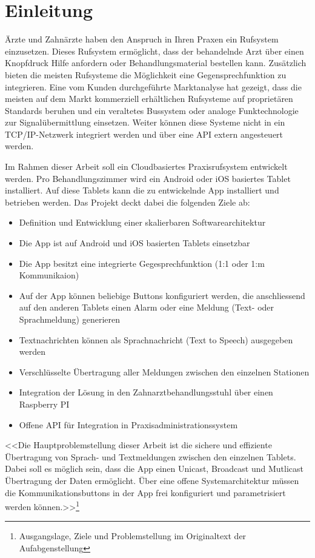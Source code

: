 \section{Einleitung}\label{sec:einleitung}

Ärzte und Zahnärzte haben den Anspruch in Ihren Praxen ein Rufsystem einzusetzen.
Dieses Rufsystem ermöglicht, dass der behandelnde Arzt über einen Knopfdruck Hilfe anfordern oder Behandlungsmaterial bestellen kann.
Zusätzlich bieten die meisten Rufsysteme die Möglichkeit eine Gegensprechfunktion zu integrieren.
Eine vom Kunden durchgeführte Marktanalyse hat gezeigt, dass die meisten auf dem Markt kommerziell erhältlichen Rufsysteme auf proprietären Standards beruhen und ein veraltetes Bussystem oder analoge Funktechnologie zur Signalübermittlung einsetzen.
Weiter können diese Systeme nicht in ein TCP/IP-Netzwerk integriert werden und über eine API extern angesteuert werden.

Im Rahmen dieser Arbeit soll ein Cloudbasiertes Praxisrufsystem entwickelt werden.
Pro Behandlungszimmer wird ein Android oder iOS basiertes Tablet installiert.
Auf diese Tablets kann die zu entwickelnde App installiert und betrieben werden.
Das Projekt deckt dabei die folgenden Ziele ab:

\begin{itemize}
    \item Definition und Entwicklung einer skalierbaren Softwarearchitektur
    \item Die App ist auf Android und iOS basierten Tablets einsetzbar
    \item Die App besitzt eine integrierte Gegesprechfunktion (1:1 oder 1:m Kommunikaion)
    \item Auf der App können beliebige Buttons konfiguriert werden, die anschliessend auf den anderen Tablets einen Alarm oder eine Meldung (Text- oder Sprachmeldung) generieren
    \item Textnachrichten können als Sprachnachricht (Text to Speech) ausgegeben werden
    \item Verschlüsselte Übertragung aller Meldungen zwischen den einzelnen Stationen
    \item Integration der Lösung in den Zahnarztbehandlungsstuhl über einen Raspberry PI
    \item Offene API für Integration in Praxisadministrationssystem
\end{itemize}

\textless\textless Die Hauptproblemstellung dieser Arbeit ist die sichere und effiziente Übertragung von Sprach- und Textmeldungen zwischen den einzelnen Tablets.
Dabei soll es möglich sein, dass die App einen Unicast, Broadcast und Mutlicast Übertragung der Daten ermöglicht.
Über eine offene Systemarchitektur müssen die Kommunikationsbuttons in der App frei konfiguriert und parametrisiert werden können.\textgreater\textgreater \cite{aufgabenstellung}\footnote{Ausgangslage, Ziele und Problemstellung im Originaltext der Aufabgenstellung}


